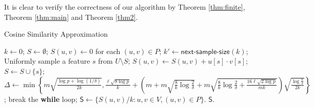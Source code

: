 \documentclass{article}
\begin{document}
It is clear to verify the correctness of our algorithm by Theorem \ref{thm:finite}, Theorem \ref{thm:main} and Theorem \ref{thm2}.

\begin{algorithm}[!t]
\caption{\textsf{Cosine Similarity Approximation}}
\label{alg:csa}
\renewcommand{\algorithmicrequire}{\textbf{Input:}}
\renewcommand{\algorithmicensure}{\textbf{Output:}}
\begin{algorithmic}
\State $k \gets 0$;
\State $S \gets \emptyset$;
\State $S(u,v) \gets 0$ for each $(u, v) \in P$;
	\State $k' \gets \textsf{next-sample-size}(k)$;
		\State Uniformly sample a feature $s$ from $U\setminus S$;
		\State $S(u,v) \gets S(u,v)+u[s]\cdot v[s]$;
		\State $S \gets S\cup \{s\}$;
	\EndFor
	\State $\Delta \gets \min\left\{m\sqrt{\frac{\log p + \log(1/\delta)}{2k}}, \frac{\ell\sqrt{8\log p}}{k} +\left(m+m\sqrt{\frac{8}{k}\log \frac{2}{\delta}} + m\sqrt{\frac{8}{k}\log \frac{2}{\delta} + \frac{16\ell\sqrt{2\log p}}{mk}}\right)\sqrt{\frac{\log \frac{8}{\delta}}{2k}}\right\}$;
	\If {$\Delta \leq \epsilon$}
		\State break the {\bf while} loop;
	\EndIf
\EndWhile
\State $\mathsf{S} \gets \{S(u,v)/k : u,v\in V, (u,v)\in P\}$.
 $\mathsf{S}$.
\end{algorithmic}
\end{algorithm}
\end{document}
